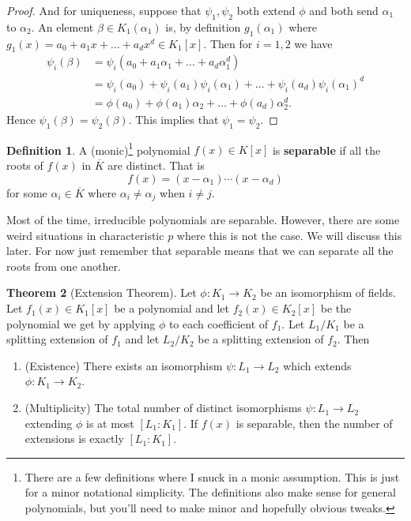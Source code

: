 \documentclass[11pt]{article}
\theoremstyle{definition}
\newtheorem{theorem}{Theorem}[section]
\newtheorem{definition}[theorem]{Definition}
\numberwithin{equation}{subsection}
\begin{document}
\begin{proof}
    And for uniqueness, suppose that $\psi_1, \psi_2$ both extend $\phi$ and both send $\alpha_1$ to $\alpha_2$.
    An element $\beta \in K_1(\alpha_1)$ is, by definition $g_1(\alpha_1)$ where $g_1(x) = a_0 + a_1x + \ldots + a_d x^d \in K_1[x]$.
    Then for $i = 1, 2$ we have
    \begin{align*}
        \psi_i(\beta) &= \psi_i(a_0 + a_1\alpha_1 + \ldots + a_d\alpha_1^d)\\
        &= \psi_i(a_0) + \psi_i(a_1)\psi_i(\alpha_1) + \ldots + \psi_i(a_d)\psi_i(\alpha_1)^d\\
        &= \phi(a_0) + \phi(a_1)\alpha_2 + \ldots + \phi(a_d)\alpha_2^d.
    \end{align*}
    Hence $\psi_1(\beta) = \psi_2(\beta)$.
    This implies that $\psi_1 = \psi_2$.
\end{proof}

\begin{definition}
    A (monic)\footnote{There are a few definitions where I snuck in a monic assumption.
    This is just for a minor notational simplicity.
    The definitions also make sense for general polynomials, but you'll need to make minor and hopefully obvious tweaks.} polynomial $f(x) \in K[x]$ is \textbf{separable} if all the roots of $f(x)$ in $\overline{K}$ are distinct.
    That is
    \[
        f(x) = (x - \alpha_1)\cdots (x - \alpha_d)
    \]
    for some $\alpha_i \in \overline{K}$ where $\alpha_i \neq \alpha_j$ when $i \neq j$.
\end{definition}

Most of the time, irreducible polynomials are separable.
However, there are some weird situations in characteristic $p$ where this is not the case.
We will discuss this later.
For now just remember that separable means that we can separate all the roots from one another.

\begin{theorem}[Extension Theorem]
\label{thm: extension theorem}
    Let $\phi : K_1 \to K_2$ be an isomorphism of fields.
    Let $f_1(x) \in K_1[x]$ be a polynomial and let $f_2(x) \in K_2[x]$ be the polynomial we get by applying $\phi$ to each coefficient of $f_1$.
    Let $L_1/K_1$ be a splitting extension of $f_1$ and let $L_2/K_2$ be a splitting extension of $f_2$.
    Then
    \begin{enumerate}
        \item (Existence) There exists an isomorphism $\psi : L_1 \to L_2$ which extends $\phi : K_1 \to K_2$.

        \item (Multiplicity) The total number of distinct isomorphisms $\psi : L_1 \to L_2$ extending $\phi$ is at most $[L_1 : K_1]$.
        If $f(x)$ is separable, then the number of extensions is exactly $[L_1 : K_1]$.
    \end{enumerate}
\end{theorem}
\end{document}
